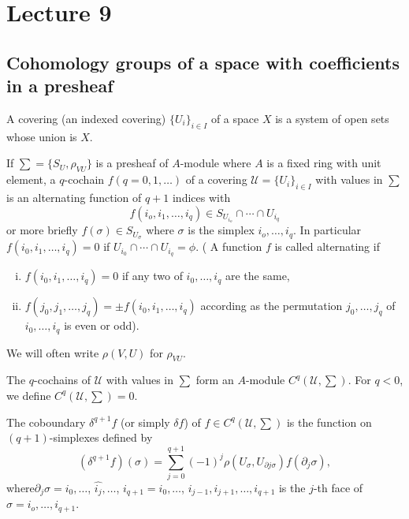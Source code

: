 \chapter{Lecture 9}\label{chap9:lec9}

\section[Cohomology groups of.....]{Cohomology groups of a space with coefficients
  in a presheaf}\pageoriginale 

\begin{defi*}%
A covering (an indexed covering) $\{ U_i \}_{i \in I}$ of a space $X$
is a system of open sets whose union is $X$. 
\end{defi*}

\begin{defi*}%
If $\sum = \{ S_U, \rho_{VU} \}$ is a presheaf of $A$-module where $A$ 
is a fixed ring with unit element, a $q$-cochain $f(q = 0, 1,
\ldots)$ of a covering $\mathscr{U} = \{U_i\}_{ i \in I}$ with values
in $\sum$ is an alternating function of $q + 1$ indices with  
$$
f(i_o, i_1, \ldots , i_q) \in S_{U_{i_o}} \cap \cdots \cap U_{i_q} 
$$
or more briefly $f(\sigma) \in S_{U_\sigma}$ where $\sigma$ is the
simplex $i_o, \ldots , i_q$. 
In particular $f(i_0, i_1, \ldots , i_q) = 0$ if $U_{i_0} \cap \cdots
\cap U_{i_q} = \phi$. 
( A function $f$ is called alternating if  
\end{defi*}
\begin{enumerate}[(i)]
\item $f(i_0, i_1, \ldots , i_q) = 0$ if any two of $i_0 , \ldots ,
  i_q$ are the same, 

\item $f(j_0, j_1, \ldots , j_q) = \pm f(i_0, i_1 , \ldots , i_q)$
  according as the permutation $j_0, \ldots , j_q$  of $i_0 , \ldots ,
  i_q$ is even or odd). 
\end{enumerate}

We will often write $\rho (V, U)$ for $\rho_{VU}$.

The $q$-cochains of $\mathscr{U}$ with values in $\sum$ form an
$A$-module $C^q (\mathscr{U}, \sum)$. For $q < 0$, we define $C^q
(\mathscr{U}, \sum) = 0$. 

\begin{defi*}%
The coboundary $\delta^{q+1} f$ (or simply $\delta f$) of $f\in
C^q(\mathscr{U}, \sum)$ is the function on $(q + 1)$-simplexes
defined by  
$$
(\delta^{q + 1} f) (\sigma) = \sum^{q + 1}_{j = 0} (-1)^j \rho 
(U_\sigma ,  U_{\partial j \sigma}) f(\partial_j \sigma), 
$$
where\pageoriginale $\partial_j \sigma = i_0 , \ldots$, $\hat{i_j} ,
\ldots$, $i_{q + 1} 
= i_0 , \ldots$, $i_{j - 1}, i_{j + 1}, \ldots , i_{q + 1}$ is the
$j$-th face of $\sigma = i_o, \ldots , i_{q + 1}$. 
\end{defi*}

